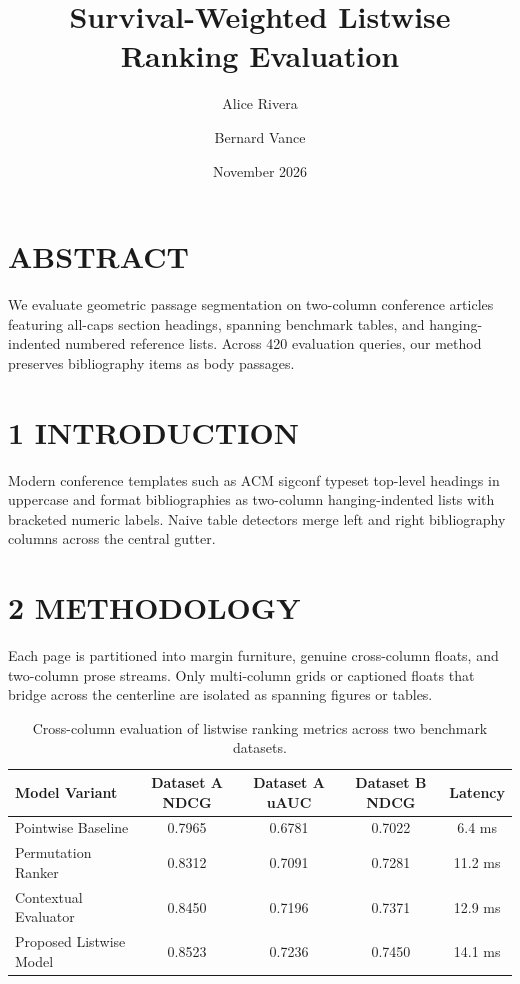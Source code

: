 \documentclass[10pt,twocolumn]{article}
\title{\textbf{Survival-Weighted Listwise Ranking Evaluation}}
\author{Alice Rivera \and Bernard Vance}
\date{November 2026}
\begin{document}
\maketitle
\thispagestyle{acmprobe}

\section*{ABSTRACT}
We evaluate geometric passage segmentation on two-column conference articles featuring all-caps section headings, spanning benchmark tables, and hanging-indented numbered reference lists. Across 420 evaluation queries, our method preserves bibliography items as body passages.

\section*{1 INTRODUCTION}
Modern conference templates such as ACM sigconf typeset top-level headings in uppercase and format bibliographies as two-column hanging-indented lists with bracketed numeric labels. Naive table detectors merge left and right bibliography columns across the central gutter.

\section*{2 METHODOLOGY}
Each page is partitioned into margin furniture, genuine cross-column floats, and two-column prose streams. Only multi-column grids or captioned floats that bridge across the centerline are isolated as spanning figures or tables.

\begin{table}[t]
\centering
\caption{Cross-column evaluation of listwise ranking metrics across two benchmark datasets.}
\vspace{3pt}
\begin{tabular}{lcccc}
\hline
Model Variant & Dataset A NDCG & Dataset A uAUC & Dataset B NDCG & Latency \\
\hline
Pointwise Baseline & 0.7965 & 0.6781 & 0.7022 & 6.4 ms \\
Permutation Ranker & 0.8312 & 0.7091 & 0.7281 & 11.2 ms \\
Contextual Evaluator & 0.8450 & 0.7196 & 0.7371 & 12.9 ms \\
Proposed Listwise Model & 0.8523 & 0.7236 & 0.7450 & 14.1 ms \\
\hline
\end{tabular}
\end{table}
\end{document}
